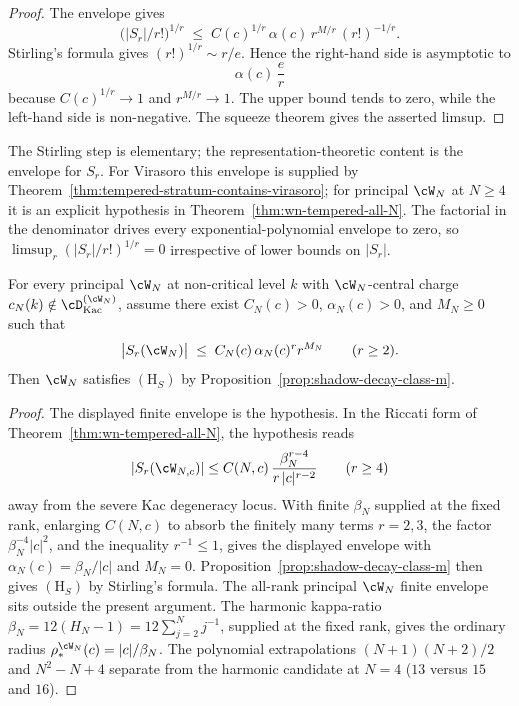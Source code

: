 \begin{proof}
The envelope gives
\[
 \bigl(\lvert S_r\rvert/r!\bigr)^{1/r}
 \;\le\;
 C(c)^{1/r}\,\alpha(c)\,r^{M/r}\,(r!)^{-1/r}.
\]
Stirling's formula gives $(r!)^{1/r}\sim r/e$. Hence the right-hand
side is asymptotic to
\[
 \alpha(c)\,\frac{e}{r}
\]
because $C(c)^{1/r}\to 1$ and $r^{M/r}\to 1$. The upper bound tends
to zero, while the left-hand side is non-negative. The squeeze theorem
gives the asserted limsup.
\end{proof}

\begin{remark}
\label{rem:comparison-classical-va-asymptotics}
The Stirling step is elementary; the representation-theoretic content
is the envelope for $S_r$. For Virasoro this envelope is supplied by
Theorem~\ref{thm:tempered-stratum-contains-virasoro}; for principal
$\cW_N$ at $N\ge 4$ it is an explicit hypothesis in
Theorem~\ref{thm:wn-tempered-all-N}. The factorial in the denominator
drives every exponential-polynomial envelope to zero, so
$\limsup_r(\lvert S_r\rvert/r!)^{1/r}=0$ irrespective of lower bounds
on $\lvert S_r\rvert$.
\end{remark}

\begin{theorem}
\label{conj:shadow-decay-class-m-full-family}
For every principal $\cW_N$ at non-critical level $k$ with
$\cW_N$-central charge $c_N(k) \notin \cD_{\mathrm{Kac}}^{(\cW_N)}$,
assume there exist $C_N(c)>0$, $\alpha_N(c)>0$, and $M_N\ge 0$ such that
\[
 \bigl\lvert S_r(\cW_N) \bigr\rvert
 \;\le\;
 C_N(c)\,\alpha_N(c)^r r^{M_N}
 \qquad (r \ge 2).
\]
Then $\cW_N$ satisfies $(\mathrm{H}_S)$ by
Proposition~\ref{prop:shadow-decay-class-m}.
\end{theorem}

\begin{proof}
The displayed finite envelope is the hypothesis. In the Riccati form of
Theorem~\ref{thm:wn-tempered-all-N}, the hypothesis reads
\[
 \lvert S_r(\cW_{N,c})\rvert
 \le
 C(N,c)\,\frac{\beta_N^{r-4}}{r\,|c|^{r-2}}
 \qquad (r\ge 4)
\]
away from the severe Kac degeneracy locus. With finite $\beta_N$
supplied at the fixed rank, enlarging $C(N,c)$ to absorb the finitely
many terms $r=2,3$, the factor $\beta_N^{-4}|c|^2$, and the inequality
$r^{-1}\le 1$, gives the displayed envelope with
$\alpha_N(c)=\beta_N/|c|$ and $M_N=0$.
Proposition~\ref{prop:shadow-decay-class-m} then gives $(\mathrm{H}_S)$
by Stirling's formula. The all-rank principal $\cW_N$ finite envelope
sits outside the present argument. The harmonic kappa-ratio
$\beta_N=12(H_N-1)=12\sum_{j=2}^{N}j^{-1}$, supplied at the fixed
rank, gives the ordinary radius
$\rho_*^{\cW_N}(c)=|c|/\beta_N$. The polynomial extrapolations
$(N+1)(N+2)/2$ and $N^2-N+4$ separate from the harmonic candidate at
$N=4$ ($13$ versus $15$ and $16$).
\end{proof}

